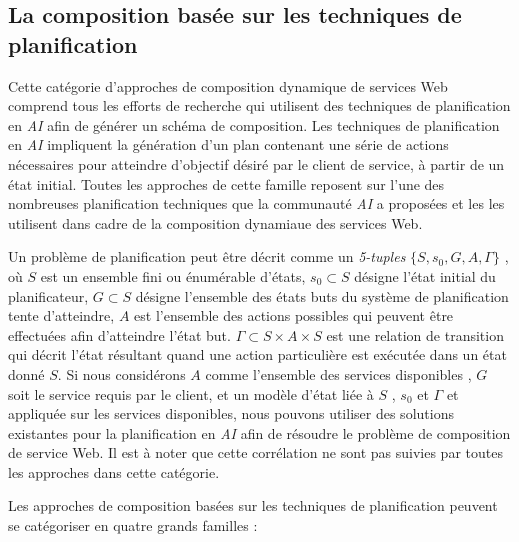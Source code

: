   \subsection{La composition basée sur les techniques de
    planification}
  \label{sec:techn-de-plan}

  Cette catégorie d'approches de composition dynamique de services Web
  comprend tous les efforts de recherche qui utilisent des techniques
  de planification en \textit{AI} afin de générer un schéma de
  composition. Les techniques de planification en \textit{AI}
  impliquent la génération d'un plan contenant une série de actions
  nécessaires pour atteindre d'objectif désiré par le client de
  service, à partir de un état initial. Toutes les approches de cette
  famille reposent sur l'une des nombreuses planification techniques
  que la communauté \textit{AI} a proposées et les les utilisent dans
  cadre de la composition dynamiaue des services Web.\medskip

  Un problème de planification peut être décrit comme un
  \textit{5-tuples} \textit{$\{S, s_0,G, A, \Gamma\}$}
  \cite{carman2003web}, où $S$ est un ensemble fini ou énumérable
  d'états, $s_0\subset S$ désigne l'état initial du planificateur,
  $G\subset S$ désigne l'ensemble des états buts du système de
  planification tente d'atteindre, $A$ est l'ensemble des actions
  possibles qui peuvent être effectuées afin d'atteindre l'état but.
  \textit{$\Gamma \subset S \times A \times S$} est une relation de
  transition qui décrit l'état résultant quand une action particulière
  est exécutée dans un état donné $S$. Si nous considérons $A$ comme
  l'ensemble des services disponibles , $G$ soit le service requis par
  le client, et un modèle d'état liée à $S$ , $s_0$ et $\Gamma$ et
  appliquée sur les services disponibles, nous pouvons utiliser des
  solutions existantes pour la planification en \textit{AI} afin de
  résoudre le problème de composition de service Web. Il est à noter
  que cette corrélation ne sont pas suivies par toutes les approches
  dans cette catégorie.\medskip

  Les approches de composition basées sur les techniques de
  planification peuvent se catégoriser en quatre grands familles
  \cite{baryannis2010}:

